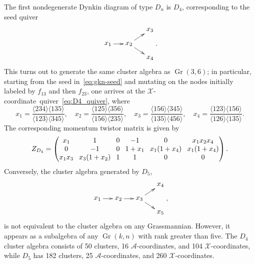 \documentclass[11pt]{article}
\DeclareMathOperator{\Gr}{Gr}
\def\ket#1{\langle #1 \rangle}
\def\xcoord{$\mathcal{X}$-coordinate}
\def\xcoords{$\mathcal{X}$-coordinates}
\def\acoords{$\mathcal{A}$-coordinates}
\begin{document}
The first nondegenerate Dynkin diagram of type $D_n$ is $D_4$, corresponding to the seed quiver
\begin{equation} \label{eq:D4_quiver}
    \begin{gathered}
    \begin{xy} 0;<1pt,0pt>:<0pt,-1pt>::
      (0,20) *+{x_1} ="1",
      (30,20) *+{x_2} ="2",
      (60,0) *+{x_3} ="3",
      (60,40) *+{x_4} ="4",
      "1", {\ar"2"},
      "2", {\ar"3"},
      "2", {\ar"4"},
    \end{xy}
    \end{gathered} .
\end{equation}
This turns out to generate the same cluster algebra as $\Gr(3,6)$; in particular, starting from the seed in~\eqref{eq:gkn-seed} and mutating on the nodes initially labeled by $f_{13}$ and then $f_{23}$, one arrives at the \xcoord\ quiver~\eqref{eq:D4_quiver}, where
\begin{equation}
x_1 = \frac{\ket{234}\ket{135}}{\ket{123}\ket{345}}, \quad x_2 = \frac{\ket{125}\ket{356}}{\ket{156}\ket{235}}, \quad x_3 = \frac{\ket{156}\ket{345}}{\ket{135}\ket{456}}, \quad x_4 = \frac{\ket{123}\ket{156}}{\ket{126}\ket{135}}.
\end{equation}
The corresponding momentum twistor matrix is given by
\begin{equation}
Z_{D_4} = 
\begingroup
\setlength\arraycolsep{4pt}
\begin{pmatrix} 
 x_1 & 1 & 0 & -1 & 0 & x_1 x_2 x_4 \\
 0 & -1 & 0 & 1+x_1 & x_1 (1+x_4) & x_1 (1+x_4) \\
 x_1 x_3 & x_3 (1+x_2)  & 1 & 1 & 0 & 0
 \end{pmatrix}
\endgroup .
\end{equation}
Conversely, the cluster algebra generated by $D_5$,
\begin{equation}\label{def:D5}
    \begin{gathered}
    \begin{xy} 0;<1pt,0pt>:<0pt,-1pt>::
      (0,20) *+{x_1} ="1",
      (30,20) *+{x_2} ="2",
      (60,20) *+{x_3} ="3",
      (90,0) *+{x_4} ="4",
      (90,40) *+{x_5} ="5",
      "1", {\ar"2"},
      "2", {\ar"3"},
      "3", {\ar"4"},
      "3", {\ar"5"},
    \end{xy}
    \end{gathered} ,
\end{equation}
is not equivalent to the cluster algebra on any Grassmannian. However, it appears as a subalgebra of any $\Gr(k,n)$ with rank greater than five. The $D_4$ cluster algebra consists of 50 clusters, 16 \acoords, and 104 \xcoords, while $D_5$ has 182 clusters, 25 \acoords, and 260 \xcoords. 
\end{document}
